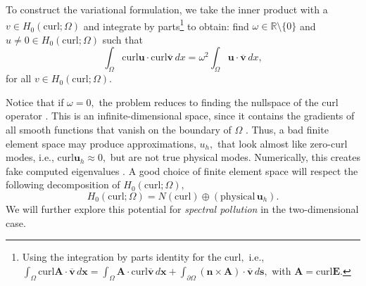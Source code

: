 \documentclass[12pt,a4paper]{article}
\theoremstyle{boldthm}
\theoremstyle{bolddefn}
\begin{document}
To construct the variational formulation, we take the inner product with a $v \in H_0(\text{curl}; \Omega)$ and integrate by parts\footnote{Using the integration by parts identity for the $\text{curl},$ i.e., $\int_{\Omega} \text{curl}\mathbf{A} \cdot \overline{\mathbf{v}} \, d\textbf{x} = \int_{\Omega} \mathbf{A} \cdot \text{curl} \overline{\mathbf{v}} \, d\textbf{x} + \int_{\partial \Omega} (\mathbf{n} \times \mathbf{A}) \cdot \overline{\mathbf{v}} \, d\textbf{s},$ with $\mathbf{A} = \text{curl}\mathbf{E}.$ } to obtain: find $\omega \in \mathbb{R}\setminus \{0\}$ and $u \ne 0 \in H_0(\text{curl}; \Omega)$ such that
\begin{equation}
    \int_{\Omega} \text{curl}\mathbf{u} \cdot \text{curl}\overline{\mathbf{v}} \, dx = \omega^2 \int_{\Omega} \mathbf{u} \cdot \overline{\mathbf{v}} \, dx,
\end{equation}
for all $v \in H_0(\text{curl}; \Omega).$

Notice that if $\omega = 0,$ the problem reduces to finding the nullspace of the curl operator \cite{Matt}. This is an infinite-dimensional space, since it contains the gradients of all smooth functions that vanish on the boundary of $\Omega$ \cite{Arnold}.  Thus, a bad finite element space may produce approximations, $u_h,$ that look almost like zero-curl modes, i.e., $\text{curl} \mathbf{u}_h \approx 0,$ but are not true physical modes. Numerically, this creates fake computed eigenvalues \cite{Matt}. A good choice of finite element space will respect the following decomposition of $H_0(\text{curl}; \Omega),$
\begin{equation}
    H_0(\text{curl}; \Omega) = N(\text{curl}) \oplus (\text{physical} \, \mathbf{u}_h).
\end{equation}
We will further explore this potential for \textit{spectral pollution }in the two-dimensional case. 
\end{document}
